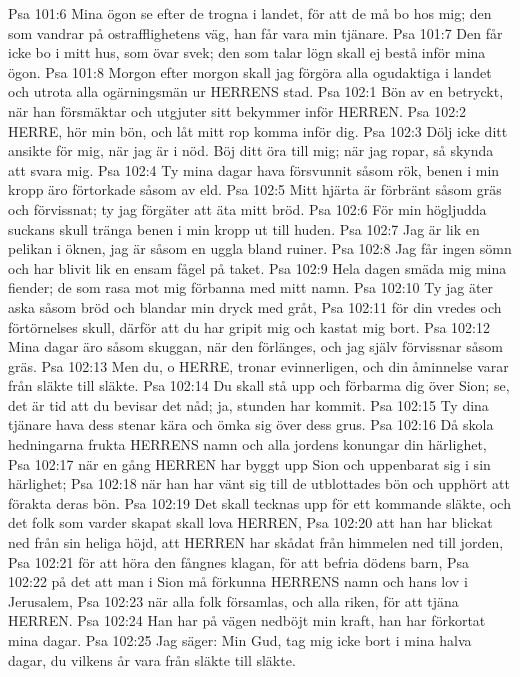 Psa 101:6  Mina ögon se efter de trogna i landet, för att de må bo hos mig; den som vandrar på ostrafflighetens väg, han får vara min tjänare.
Psa 101:7  Den får icke bo i mitt hus, som övar svek; den som talar lögn skall ej bestå inför mina ögon.
Psa 101:8  Morgon efter morgon skall jag förgöra alla ogudaktiga i landet och utrota alla ogärningsmän ur HERRENS stad.
Psa 102:1  Bön av en betryckt, när han försmäktar och utgjuter sitt bekymmer inför HERREN.
Psa 102:2  HERRE, hör min bön, och låt mitt rop komma inför dig.
Psa 102:3  Dölj icke ditt ansikte för mig, när jag är i nöd. Böj ditt öra till mig; när jag ropar, så skynda att svara mig.
Psa 102:4  Ty mina dagar hava försvunnit såsom rök, benen i min kropp äro förtorkade såsom av eld.
Psa 102:5  Mitt hjärta är förbränt såsom gräs och förvissnat; ty jag förgäter att äta mitt bröd.
Psa 102:6  För min högljudda suckans skull tränga benen i min kropp ut till huden.
Psa 102:7  Jag är lik en pelikan i öknen, jag är såsom en uggla bland ruiner.
Psa 102:8  Jag får ingen sömn och har blivit lik en ensam fågel på taket.
Psa 102:9  Hela dagen smäda mig mina fiender; de som rasa mot mig förbanna med mitt namn.
Psa 102:10  Ty jag äter aska såsom bröd och blandar min dryck med gråt,
Psa 102:11  för din vredes och förtörnelses skull, därför att du har gripit mig och kastat mig bort.
Psa 102:12  Mina dagar äro såsom skuggan, när den förlänges, och jag själv förvissnar såsom gräs.
Psa 102:13  Men du, o HERRE, tronar evinnerligen, och din åminnelse varar från släkte till släkte.
Psa 102:14  Du skall stå upp och förbarma dig över Sion; se, det är tid att du bevisar det nåd; ja, stunden har kommit.
Psa 102:15  Ty dina tjänare hava dess stenar kära och ömka sig över dess grus.
Psa 102:16  Då skola hedningarna frukta HERRENS namn och alla jordens konungar din härlighet,
Psa 102:17  när en gång HERREN har byggt upp Sion och uppenbarat sig i sin härlighet;
Psa 102:18  när han har vänt sig till de utblottades bön och upphört att förakta deras bön.
Psa 102:19  Det skall tecknas upp för ett kommande släkte, och det folk som varder skapat skall lova HERREN,
Psa 102:20  att han har blickat ned från sin heliga höjd, att HERREN har skådat från himmelen ned till jorden,
Psa 102:21  för att höra den fångnes klagan, för att befria dödens barn,
Psa 102:22  på det att man i Sion må förkunna HERRENS namn och hans lov i Jerusalem,
Psa 102:23  när alla folk församlas, och alla riken, för att tjäna HERREN.
Psa 102:24  Han har på vägen nedböjt min kraft, han har förkortat mina dagar.
Psa 102:25  Jag säger: Min Gud, tag mig icke bort i mina halva dagar, du vilkens år vara från släkte till släkte.
